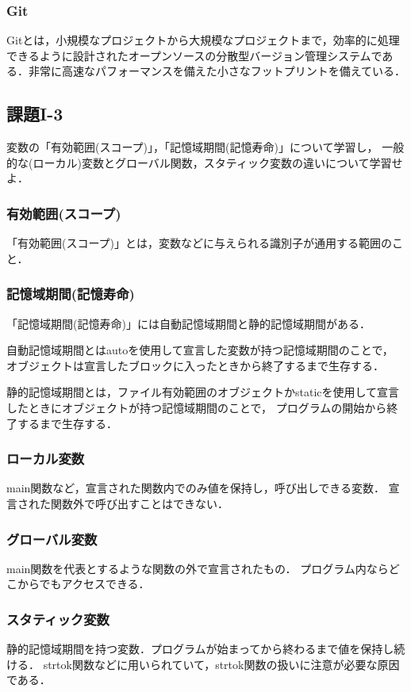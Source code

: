 \documentclass[]{jarticle}
\begin{document}
\subsubsection{Git}
Gitとは，小規模なプロジェクトから大規模なプロジェクトまで，効率的に処理できるように設計されたオープンソースの分散型バージョン管理システムである．非常に高速なパフォーマンスを備えた小さなフットプリントを備えている．
%
% 
\subsection{課題I-3}
変数の「有効範囲(スコープ)」，「記憶域期間(記憶寿命)」について学習し，
一般的な(ローカル)変数とグローバル関数，スタティック変数の違いについて学習せよ．
% 
\subsubsection{有効範囲(スコープ)}
「有効範囲(スコープ)」とは，変数などに与えられる識別子が通用する範囲のこと．

\subsubsection{記憶域期間(記憶寿命)}
「記憶域期間(記憶寿命)」には自動記憶域期間と静的記憶域期間がある．

自動記憶域期間とはautoを使用して宣言した変数が持つ記憶域期間のことで，
オブジェクトは宣言したブロックに入ったときから終了するまで生存する．

静的記憶域期間とは，ファイル有効範囲のオブジェクトかstaticを使用して宣言したときにオブジェクトが持つ記憶域期間のことで，
プログラムの開始から終了するまで生存する．

\subsubsection{ローカル変数}
main関数など，宣言された関数内でのみ値を保持し，呼び出しできる変数．
宣言された関数外で呼び出すことはできない．
% 
\subsubsection{グローバル変数}
main関数を代表とするような関数の外で宣言されたもの．
プログラム内ならどこからでもアクセスできる．
% 
\subsubsection{スタティック変数}
静的記憶域期間を持つ変数．プログラムが始まってから終わるまで値を保持し続ける．
strtok関数などに用いられていて，strtok関数の扱いに注意が必要な原因である．
% 
%
\end{document}
